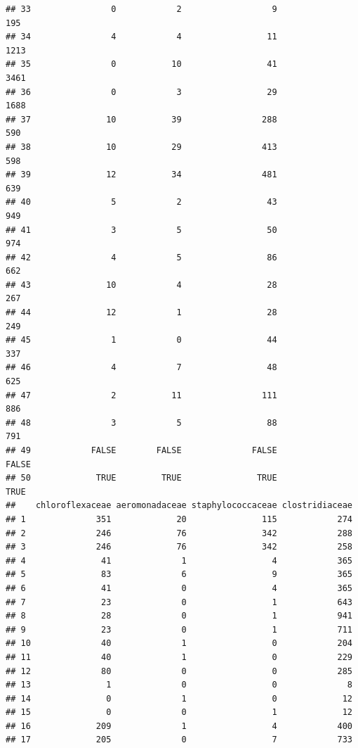 \documentclass[12pt]{beamer}\usepackage[]{graphicx}\usepackage[]{color}
\makeatletter
\newenvironment{kframe}{%
 \def\at@end@of@kframe{}%
 \ifinner\ifhmode%
  \def\at@end@of@kframe{\end{minipage}}%
  \begin{minipage}{\columnwidth}%
 \fi\fi%
 \def\FrameCommand##1{\hskip\@totalleftmargin \hskip-\fboxsep
 \colorbox{shadecolor}{##1}\hskip-\fboxsep
     \hskip-\linewidth \hskip-\@totalleftmargin \hskip\columnwidth}%
 \MakeFramed {\advance\hsize-\width
   \@totalleftmargin\z@ \linewidth\hsize
   \@setminipage}}%
 {\par\unskip\endMakeFramed%
 \at@end@of@kframe}
\newenvironment{knitrout}{}{} %
\makeatother
\begin{document}
\begin{frame}[fragile]
\begin{knitrout}
\begin{kframe}
\begin{verbatim}
## 33                0            2                  9                 195
## 34                4            4                 11                1213
## 35                0           10                 41                3461
## 36                0            3                 29                1688
## 37               10           39                288                 590
## 38               10           29                413                 598
## 39               12           34                481                 639
## 40                5            2                 43                 949
## 41                3            5                 50                 974
## 42                4            5                 86                 662
## 43               10            4                 28                 267
## 44               12            1                 28                 249
## 45                1            0                 44                 337
## 46                4            7                 48                 625
## 47                2           11                111                 886
## 48                3            5                 88                 791
## 49            FALSE        FALSE              FALSE               FALSE
## 50             TRUE         TRUE               TRUE                TRUE
##    chloroflexaceae aeromonadaceae staphylococcaceae clostridiaceae
## 1              351             20               115            274
## 2              246             76               342            288
## 3              246             76               342            258
## 4               41              1                 4            365
## 5               83              6                 9            365
## 6               41              0                 4            365
## 7               23              0                 1            643
## 8               28              0                 1            941
## 9               23              0                 1            711
## 10              40              1                 0            204
## 11              40              1                 0            229
## 12              80              0                 0            285
## 13               1              0                 0              8
## 14               0              1                 0             12
## 15               0              0                 1             12
## 16             209              1                 4            400
## 17             205              0                 7            733

\end{verbatim}
\end{kframe}
\end{knitrout}
\end{frame}
\end{document}
